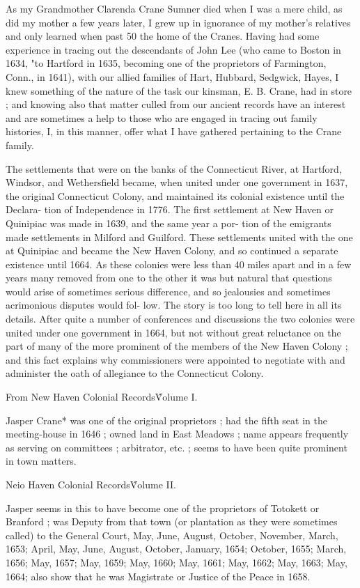 As my Grandmother Clarenda Crane Sumner died when I was 
a mere child, as did my mother a few years later, I grew up in 
ignorance of my mother's relatives and only learned when past 
50 the home of the Cranes. Having had some experience in 
tracing out the descendants of John Lee (who came to Boston in 
1634, "to Hartford in 1635, becoming one of the proprietors of 
Farmington, Conn., in 1641), with our allied families of Hart, 
Hubbard, Sedgwick, Hayes, I knew something of the nature of 
the task our kinsman, E. B. Crane, had in store ; and knowing 
also that matter culled from our ancient records have an interest 
and are sometimes a help to those who are engaged in tracing out 
family histories, I, in this manner, offer what I have gathered 
pertaining to the Crane family. 

The settlements that were on the banks of the Connecticut 
River, at Hartford, Windsor, and Wethersfield became, when 
united under one government in 1637, the original Connecticut 
Colony, and maintained its colonial existence until the Declara- 
tion of Independence in 1776. The first settlement at New 
Haven or Quinipiac was made in 1639, and the same year a por- 
tion of the emigrants made settlements in Milford and Guilford. 
These settlements united with the one at Quinipiac and became 
the New Haven Colony, and so continued a separate existence 
until 1664. As these colonies were less than 40 miles apart and 
in a few years many removed from one to the other it was but 
natural that questions would arise of sometimes serious difference, 
and so jealousies and sometimes acrimonious disputes would fol- 
low. The story is too long to tell here in all its details. After 
quite a number of conferences and discussions the two colonies 
were united under one government in 1664, but not without great 
reluctance on the part of many of the more prominent of the 
members of the New Haven Colony ; and this fact explains why 
commissioners were appointed to negotiate with and administer 
the oath of allegiance to the Connecticut Colony. 

From New Haven Colonial Records\^ Volume I. 

Jasper Crane* was one of the original proprietors ; had the 
fifth seat in the meeting-house in 1646 ; owned land in East 
Meadows ; name appears frequently as serving on committees ; 
arbitrator, etc. ; seems to have been quite prominent in town 
matters. 

Neio Haven Colonial Records\^ Volume II. 

Jasper seems in this to have become one of the proprietors of 
Totokett or Branford ; was Deputy from that town (or plantation 
as they were sometimes called) to the General Court, May, June, 
August, October, November, March, 1653; April, May, June, 
August, October, January, 1654; October, 1655; March, 1656; 
May, 1657; May, 1659; May, 1660; May, 1661; May, 1662; 
May, 1663; May, 1664; also show that he was Magistrate or 
Justice of the Peace in 1658. 

